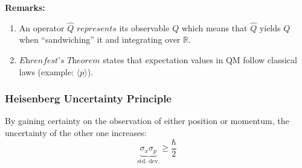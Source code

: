 \textbf{Remarks:}
\begin{enumerate}
    \item An operator $\hat{Q}$ $\textit{represents}$ its observable $Q$ which means that $\hat{Q}$ yields $Q$ when ``sandwiching'' it and integrating over $\mathbb{R}$.
    \item $\textit{Ehrenfest's Theorem}$ states that expectation values in QM follow classical laws (example: $\langle p \rangle$).
\end{enumerate}

\subsubsection{Heisenberg Uncertainty Principle}
By gaining certainty on the observation of either position or momentum, the uncertainty of the other one increases:
\begin{equation*}
    \underbrace{\sigma_x\sigma_p}_{\text{std.\ dev.}} \geq \frac{\hbar}{2}
\end{equation*}


